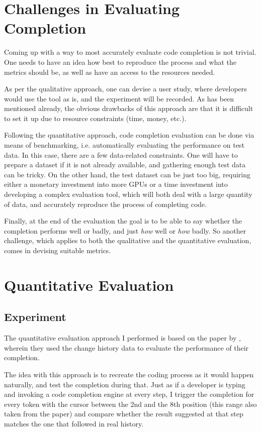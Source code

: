 \section{Challenges in Evaluating Completion}
\label{sec:Evaluation-Challenges}
Coming up with a way to most accurately evaluate code completion is not trivial. One needs to have an idea how best to reproduce the process and what the metrics should be, as well as have an access to the resources needed.

As per the qualitative approach, one can devise a user study, where developers would use the tool as is, and the experiment will be recorded. As has been mentioned already, the obvious drawbacks of this approach are that it is difficult to set it up due to resource constraints (time, money, etc.).

Following the quantitative approach, code completion evaluation can be done via means of benchmarking, i.e. automatically evaluating the performance on test data. In this case, there are a few data-related constraints. One will have to prepare a dataset if it is not already available, and gathering enough test data can be tricky. On the other hand, the test dataset can be just too big, requiring either a monetary investment into more GPUs or a time investment into developing a complex evaluation tool, which will both deal with a large quantity of data, and accurately reproduce the process of completing code.

Finally, at the end of the evaluation the goal is to be able to say whether the completion performs well or badly, and just \textit{how} well or \textit{how} badly. So another challenge, which applies to both the qualitative and the quantitative evaluation, comes in devising suitable metrics.

\section{Quantitative Evaluation}
\label{sec:Evaluation-Quantitative}
\subsection{Experiment}
The quantitative evaluation approach I performed is based on the paper by \cite{Robb08a}, wherein they used the change history data to evaluate the performance of their completion.

The idea with this approach is to recreate the coding process as it would happen naturally, and test the completion during that. Just as if a developer is typing and invoking a code completion engine at every step, I trigger the completion for every token with the cursor between the 2nd and the 8th position (this range also taken from the \cite{Robb08a} paper) and compare whether the result suggested at that step matches the one that followed in real history.

